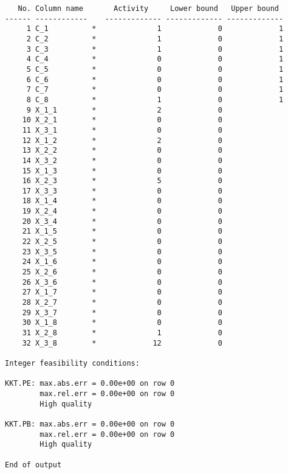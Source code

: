 \documentclass[12pt, openany]{report}
\begin{document}
\begin{lstlisting}
   No. Column name       Activity     Lower bound   Upper bound
------ ------------    ------------- ------------- -------------
     1 C_1          *              1             0             1 
     2 C_2          *              1             0             1 
     3 C_3          *              1             0             1 
     4 C_4          *              0             0             1 
     5 C_5          *              0             0             1 
     6 C_6          *              0             0             1 
     7 C_7          *              0             0             1 
     8 C_8          *              1             0             1 
     9 X_1_1        *              2             0               
    10 X_2_1        *              0             0               
    11 X_3_1        *              0             0               
    12 X_1_2        *              2             0               
    13 X_2_2        *              0             0               
    14 X_3_2        *              0             0               
    15 X_1_3        *              0             0               
    16 X_2_3        *              5             0               
    17 X_3_3        *              0             0               
    18 X_1_4        *              0             0               
    19 X_2_4        *              0             0               
    20 X_3_4        *              0             0               
    21 X_1_5        *              0             0               
    22 X_2_5        *              0             0               
    23 X_3_5        *              0             0               
    24 X_1_6        *              0             0               
    25 X_2_6        *              0             0               
    26 X_3_6        *              0             0               
    27 X_1_7        *              0             0               
    28 X_2_7        *              0             0               
    29 X_3_7        *              0             0               
    30 X_1_8        *              0             0               
    31 X_2_8        *              1             0               
    32 X_3_8        *             12             0               

Integer feasibility conditions:

KKT.PE: max.abs.err = 0.00e+00 on row 0
        max.rel.err = 0.00e+00 on row 0
        High quality

KKT.PB: max.abs.err = 0.00e+00 on row 0
        max.rel.err = 0.00e+00 on row 0
        High quality

End of output

\end{lstlisting}
\end{document}
